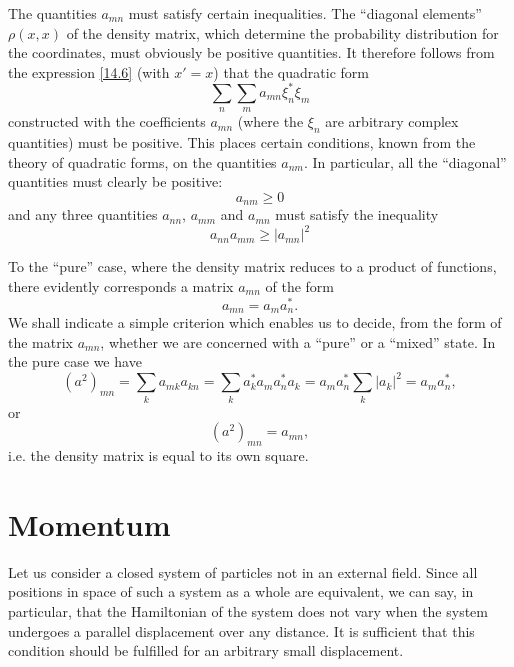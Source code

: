The quantities $ a_{mn} $ must satisfy certain inequalities. The “diagonal elements” $ \rho(x, x) $ of the density matrix, which determine the probability distribution for the coordinates, must obviously be positive quantities. It therefore follows from the expression \eqref{14.6} (with $ x'= x $) that the quadratic form
\[ \sum_n\sum_ma_{mn}\xi_n^*\xi_m \]
constructed with the coefficients $ a_{mn} $ (where the $ \xi_n $ are arbitrary complex quantities) must be positive. This places certain conditions, known from the theory of quadratic forms, on the quantities $ a_{nm} $. In particular, all the “diagonal” quantities must clearly be positive:
\begin{equation}\label{14.9}
a_{nm}\geqslant0
\end{equation}
and any three quantities $ a_{nn} $, $ a_{mm} $ and $ a_{mn} $ must satisfy the inequality
\begin{equation}\label{14.10}
a_{nn}a_{mm}\geqslant|a_{mn}|^2
\end{equation}


To the “pure” case, where the density matrix reduces to a product of functions, there evidently corresponds a matrix $ a_{mn} $ of the form
\begin{equation}\label{14.11}
a_{mn}=a_ma_n^*.
\end{equation}
We shall indicate a simple criterion which enables us to decide, from the form of the matrix $ a_{mn} $, whether we are concerned with a “pure” or a “mixed” state. In the pure case we have
\[ (a^2)_{mn}=\sum_ka_{mk}a_{kn}=\sum_ka_k^*a_ma_n^*a_k=a_ma_n^*\sum_k|a_k|^2=a_ma_n^*, \]
or
\begin{equation}\label{14.12}
(a^2)_{mn}=a_{mn},
\end{equation}
i.e. the density matrix is equal to its own square.
\section{Momentum}\label{Momentum}
Let us consider a closed system of particles not in an external field. Since all positions in space of such a system as a whole are equivalent, we can say, in particular, that the Hamiltonian of the system does not vary when the system undergoes a parallel displacement over any distance. It is sufficient that this condition should be fulfilled for an arbitrary small displacement.

